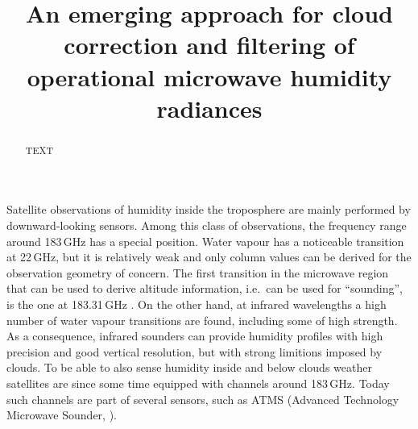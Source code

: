 \documentclass[amt, manuscript]{copernicus}
\begin{document}
\title{An emerging approach for cloud correction and filtering of operational
  microwave humidity radiances}










\maketitle


\begin{abstract}
TEXT
\end{abstract}




\introduction
%
Satellite observations of humidity inside the troposphere are mainly performed
by downward-looking sensors. Among this class of observations, the frequency
range around 183\,GHz has a special position. Water vapour has a noticeable
transition at 22\,GHz, but it is relatively weak and only column values can be
derived \citep[e.g.][]{schluessel1990atmospheric} for the observation geometry
of concern. The first transition in the microwave region that can be used to
derive altitude information, i.e.\ can be used for ``sounding'', is the one at
183.31\,GHz \citep{kakar1983retrieval,wang1983profiling}. On the other hand, at
infrared wavelengths a high number of water vapour transitions are found,
including some of high strength. As a consequence, infrared sounders can
provide humidity profiles with high precision and good vertical resolution, but
with strong limitions imposed by clouds. To be able to also sense humidity
inside and below clouds weather satellites are since some time equipped with
channels around 183\,GHz. Today such channels are part of several sensors, such
as ATMS (Advanced Technology Microwave Sounder, \citet{weng2012introduction}).
\end{document}
